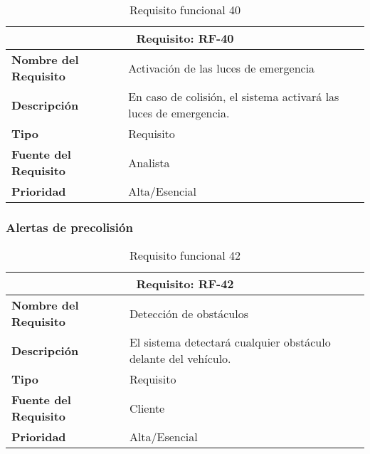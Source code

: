 \begin{table}[H]
\begin{center}
\begin{tabular}{p{} p{7cm}}
\multicolumn{2}{c}{\textbf{Requisito: RF-40} } \\
\hline \hline
\textbf{Nombre del Requisito} & Activación de las luces de emergencia\\
\hline
\textbf{Descripción} & En caso de colisión, el sistema activará las luces de emergencia.\\
\hline
\textbf{Tipo} & Requisito  \\
\hline
\textbf{Fuente del Requisito} & Analista  \\
\hline
\textbf{Prioridad} & Alta/Esencial  \\ \hline
\end{tabular}
\caption{Requisito funcional 40}
\label{tab:RF-40}
\end{center}
\end{table}

\subsubsection{Alertas de precolisión}

\begin{table}[H]
\begin{center}
\begin{tabular}{p{} p{7cm}}
\multicolumn{2}{c}{\textbf{Requisito: RF-42} } \\
\hline \hline
\textbf{Nombre del Requisito} & Detección de obstáculos\\
\hline
\textbf{Descripción} &  El sistema detectará cualquier obstáculo delante del vehículo.\\
\hline
\textbf{Tipo} & Requisito  \\
\hline
\textbf{Fuente del Requisito} & Cliente  \\
\hline
\textbf{Prioridad} & Alta/Esencial \\ \hline
\end{tabular}
\caption{Requisito funcional 42}
\label{tab:RF-42}
\end{center}
\end{table}

